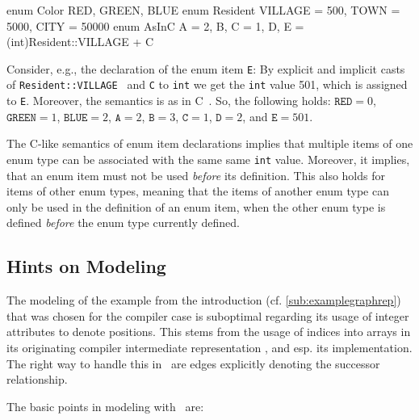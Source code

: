 \begin{example}
\begin{grgen}
enum Color {RED, GREEN, BLUE}
enum Resident {VILLAGE = 500, TOWN = 5000, CITY = 50000}
enum AsInC {A = 2, B, C = 1, D, E = (int)Resident::VILLAGE + C}
\end{grgen}
Consider, e.g., the declaration of the enum item {\tt E}:
By explicit and implicit casts of {\tt Resident::VILLAGE } and {\tt C} to {\tt int} we get the {\tt int} value 501, which is assigned to {\tt E}.
Moreover, the semantics is as in C~\cite{Sch:1990:ANSIC}. So, the following holds: $\texttt{RED} = 0$, $\texttt{GREEN} = 1$, $\texttt{BLUE} = 2$, $\texttt{A}=2$, $\texttt{B}=3$, $\texttt{C}=1$, $\texttt{D}=2$, and $\texttt{E}=501$.
\end{example}

\begin{note}
	The C-like semantics of enum item declarations implies that multiple items of one enum type can be associated with the same same {\tt int} value.
	Moreover, it implies, that an enum item must not be used \emph{before} its definition.
	This also holds for items of other enum types, meaning that the items of another enum type can only be used in the definition of an enum item, when the other enum type is defined \emph{before} the enum type currently defined.
\end{note}


\subsection{Hints on Modeling}\label{modelcontainsnext}

The modeling of the example from the introduction (cf. \ref{sub:examplegraphrep}) that was chosen for the compiler case\cite{CompilerCase} is suboptimal regarding its usage of integer attributes to denote positions.
This stems from the usage of indices into arrays in its originating compiler intermediate representation \Firm, and esp. its implementation.
The right way to handle this in \GrG\ are edges explicitly denoting the successor relationship.

The basic points in modeling with \GrG\ are:


